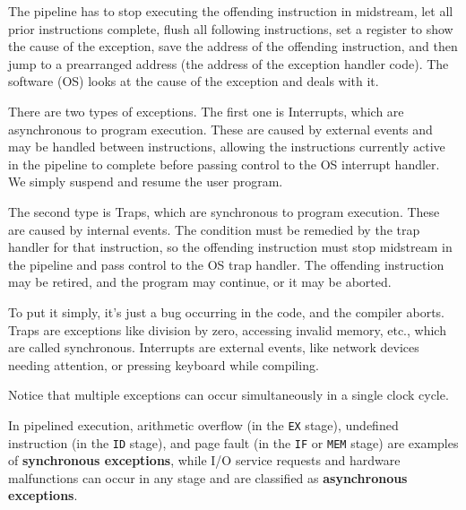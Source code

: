The pipeline has to stop executing the offending instruction in midstream, let all prior instructions complete, flush all following instructions, set a register to show the cause of the exception, save the address of the offending instruction, and then jump to a prearranged address (the address of the exception handler code). The software (OS) looks at the cause of the exception and deals with it.

There are two types of exceptions. The first one is Interrupts, which are asynchronous to program execution. These are caused by external events and may be handled between instructions, allowing the instructions currently active in the pipeline to complete before passing control to the OS interrupt handler. We simply suspend and resume the user program.

The second type is Traps, which are synchronous to program execution. These are caused by internal events. The condition must be remedied by the trap handler for that instruction, so the offending instruction must stop midstream in the pipeline and pass control to the OS trap handler. The offending instruction may be retired, and the program may continue, or it may be aborted.

To put it simply, it's just a bug occurring in the code, and the compiler aborts. Traps are exceptions like division by zero, accessing invalid memory, etc., which are called synchronous. Interrupts are external events, like network devices needing attention, or pressing keyboard while compiling.

Notice that multiple exceptions can occur simultaneously in a single clock cycle.

In pipelined execution, arithmetic overflow (in the \verb|EX| stage), undefined instruction (in the \verb|ID| stage), and page fault (in the \verb|IF| or \verb|MEM| stage) are examples of \textbf{synchronous exceptions}, while I/O service requests and hardware malfunctions can occur in any stage and are classified as \textbf{asynchronous exceptions}.

